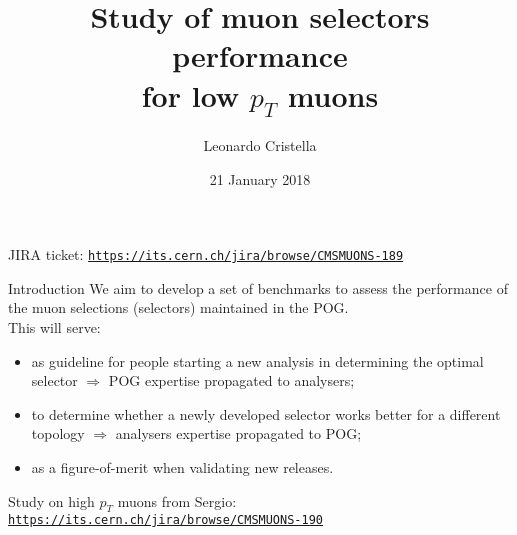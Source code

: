 \documentclass{beamer}
\title[Muon selectors]{Study of muon selectors performance \\
for low \texorpdfstring{$p_T$}{pT} muons}
\author{Leonardo Cristella}
\institute{University \& INFN of Bari}
\date{21 January 2018}
\begin{document}

\begin{frame}
  \titlepage
  
  JIRA ticket: \texttt{\underline{https://its.cern.ch/jira/browse/CMSMUONS-189}}
\end{frame}


\begin{frame}{Introduction}
We aim to develop a set of benchmarks to assess the performance of the muon selections (selectors) maintained in the POG.\\
This will serve:
\begin{itemize}
    \item as guideline for people starting a new analysis in determining the optimal selector $\Rightarrow$ POG expertise propagated to analysers;
    
    \item to determine whether a newly developed selector works better for a different topology  $\Rightarrow$ analysers expertise propagated to POG;

    \item as a figure-of-merit when validating new releases.
\end{itemize}

\bigskip

Study on high $p_T$ muons from Sergio:\\
\texttt{\underline{https://its.cern.ch/jira/browse/CMSMUONS-190}}
  
\end{frame}
\def \analyses {BPH-15-005, BPH-18-002, BPH-16-004, BPH-17-003}
\def \titles {{%
"Quarkonium cross sections with early data at c.o.m. energy of 13 TeV",%
"Search for resonances decaying to $\Upsilon(1S)$ + two leptons",%
"Measurement of $B_s \to \mu^+ \mu^-$ effective lifetime and search for $B^0 \to \mu^+ \mu^-$",%
"Search for $\tau \to 3\mu$ decay (W channel)"
}}
\def \BMuMuBkg {\Lambda_b/B_{(s)} \to h^+ h^-}
\def \bkgs {{%
"combinatorial only",%
"$\Upsilon(1S) \to \mu \mu$ as close to the signal mass region considered ([13, 28] GeV)",%
"$\BMuMuBkg$",%
"QCD (processes are estimated purely from data sidebands and no MC sample is considered for the background modeling)"%
}}
\def \preSels {{%
"$p_T(\mu) > 3.5\,GeV$, $|\eta(\mu)| < 2.4$",%
"$p_T(\mu) > 2.5\,GeV$, $|\eta(\mu)| < 1.4$",%
"$p_T(\mu) > 4\,GeV$,   $|\eta(\mu)| < 1.4$",%
"$p_T(\mu) > 1\,GeV$,   $|\eta(\mu)| < 2.4$"
}}
\end{document}
